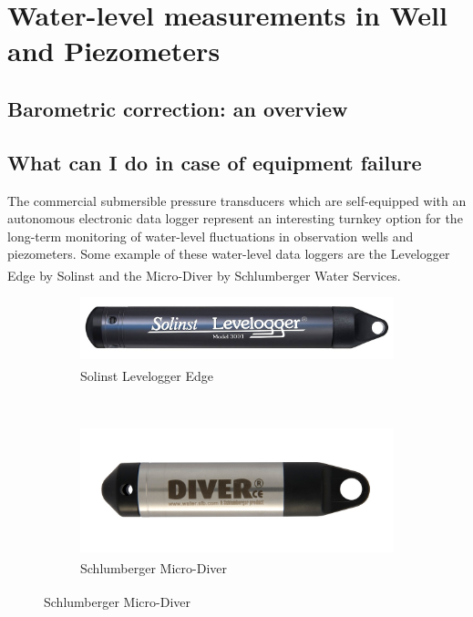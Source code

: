 \documentclass[WHATMANUAL.tex]{subfiles}
\begin{document}
\chapter{Water-level measurements in Well and Piezometers}

\section{Barometric correction: an overview}

\section{What can I do in case of equipment failure}

The commercial submersible pressure transducers which are self-equipped with an autonomous electronic data logger represent an interesting turnkey option for the long-term monitoring of water-level fluctuations in observation wells and piezometers. Some example of these water-level data loggers are the Levelogger Edge\textsuperscript{\textregistered} by Solinst and the Micro-Diver\textsuperscript{\textregistered} by Schlumberger Water Services. 

\begin{figure}[!ht]
        \centering
        \begin{subfigure}[t]{0.5\textwidth}
                \includegraphics[width=\textwidth]{img/Solinst_EdgeLeveLogger}
                \caption{Solinst Levelogger Edge\textsuperscript{\textregistered}}
                \label{subfig:levelogger_solinst}                
        \end{subfigure}%
        \\[0.5cm]
        \begin{subfigure}[t]{0.5\textwidth}
                \includegraphics[width=\textwidth]{img/Schlumberger_MiniDiver}
                \caption{Schlumberger Micro-Diver\textsuperscript{\textregistered}}
                \label{subfig:levelogger_schlumberger}
        \end{subfigure}       
\end{figure}
\end{document}
